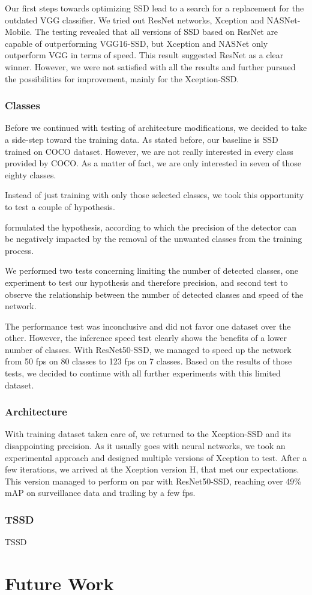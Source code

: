 Our first steps towards optimizing SSD lead to a search for a replacement for the outdated VGG classifier. We tried out ResNet networks, Xception and NASNet-Mobile. The testing revealed that all versions of SSD based on ResNet are capable of outperforming VGG16-SSD, but Xception and NASNet only outperform VGG in terms of speed. This result suggested ResNet as a clear winner. However, we were not satisfied with all the results and further pursued the possibilities for improvement, mainly for the Xception-SSD. 

\subsubsection*{Classes}
Before we continued with testing of architecture modifications, we decided to take a side-step toward the training data. As stated before, our baseline is SSD trained on COCO dataset. However, we are not really interested in every class provided by COCO. As a matter of fact, we are only interested in seven of those eighty classes.

Instead of just training with only those selected classes, we took this opportunity to test a couple of hypothesis. 

formulated the hypothesis, according to which the precision of the detector can be negatively impacted by the removal of the unwanted classes from the training process. 

We performed two tests concerning limiting the number of detected classes, one experiment to test our hypothesis and therefore precision, and second test to observe the relationship between the number of detected classes and speed of the network.

The performance test was inconclusive and did not favor one dataset over the other. However, the inference speed test clearly shows the benefits of a lower number of classes. With ResNet50-SSD, we managed to speed up the network from 50 fps on 80 classes to 123 fps on 7 classes. Based on the results of those tests, we decided to continue with all further experiments with this limited dataset.

\subsubsection*{Architecture}
With training dataset taken care of, we returned to the Xception-SSD and its disappointing precision. As it usually goes with neural networks, we took an experimental approach and designed multiple versions of Xception to test. After a few iterations, we arrived at the Xception version H, that met our expectations. This version managed to perform on par with ResNet50-SSD, reaching over 49\% mAP on surveillance data and trailing by a few fps. 

\subsubsection*{TSSD}
TSSD



\section*{Future Work}




